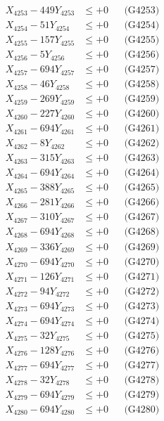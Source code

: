 \documentclass[a4paper,10pt]{article}
\begin{document}
{\begin{align}
X_{4253} - 449Y_{4253} &\leq +0 && \text{(G4253)} \\
X_{4254} - 51Y_{4254} &\leq +0 && \text{(G4254)} \\
X_{4255} - 157Y_{4255} &\leq +0 && \text{(G4255)} \\
X_{4256} - 5Y_{4256} &\leq +0 && \text{(G4256)} \\
X_{4257} - 694Y_{4257} &\leq +0 && \text{(G4257)} \\
X_{4258} - 46Y_{4258} &\leq +0 && \text{(G4258)} \\
X_{4259} - 269Y_{4259} &\leq +0 && \text{(G4259)} \\
X_{4260} - 227Y_{4260} &\leq +0 && \text{(G4260)} \\
\allowbreak
X_{4261} - 694Y_{4261} &\leq +0 && \text{(G4261)} \\
X_{4262} - 8Y_{4262} &\leq +0 && \text{(G4262)} \\
X_{4263} - 315Y_{4263} &\leq +0 && \text{(G4263)} \\
X_{4264} - 694Y_{4264} &\leq +0 && \text{(G4264)} \\
X_{4265} - 388Y_{4265} &\leq +0 && \text{(G4265)} \\
X_{4266} - 281Y_{4266} &\leq +0 && \text{(G4266)} \\
X_{4267} - 310Y_{4267} &\leq +0 && \text{(G4267)} \\
X_{4268} - 694Y_{4268} &\leq +0 && \text{(G4268)} \\
X_{4269} - 336Y_{4269} &\leq +0 && \text{(G4269)} \\
X_{4270} - 694Y_{4270} &\leq +0 && \text{(G4270)} \\
\allowbreak
X_{4271} - 126Y_{4271} &\leq +0 && \text{(G4271)} \\
X_{4272} - 94Y_{4272} &\leq +0 && \text{(G4272)} \\
X_{4273} - 694Y_{4273} &\leq +0 && \text{(G4273)} \\
X_{4274} - 694Y_{4274} &\leq +0 && \text{(G4274)} \\
X_{4275} - 32Y_{4275} &\leq +0 && \text{(G4275)} \\
X_{4276} - 128Y_{4276} &\leq +0 && \text{(G4276)} \\
X_{4277} - 694Y_{4277} &\leq +0 && \text{(G4277)} \\
X_{4278} - 32Y_{4278} &\leq +0 && \text{(G4278)} \\
X_{4279} - 694Y_{4279} &\leq +0 && \text{(G4279)} \\
X_{4280} - 694Y_{4280} &\leq +0 && \text{(G4280)} \\

\end{align}}
\end{document}
